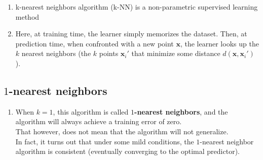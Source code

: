 \begin{enumerate}
    \item k-nearest neighbors algorithm (k-NN) is a non-parametric supervised learning method

    \item Here, at training time, the learner simply memorizes the dataset. Then, at prediction time, when confronted with a new point $\mathbf{x}$, the learner looks up the $k$ nearest neighbors (the $k$ points $\mathbf{x}_i'$ that minimize some distance $d(\mathbf{x}, \mathbf{x}_i')$).
    
\end{enumerate}

\subsection{$1$-nearest neighbors} \label{1-nearest neighbors}

\begin{enumerate}
    \item When $k=1$, this algorithm is called \textbf{$1$-nearest neighbors}, and the algorithm will always achieve a training error of zero.\\
    That however, does not mean that the algorithm will not generalize.\\
    In fact, it turns out that under some mild conditions, the $1$-nearest neighbor algorithm is consistent (eventually converging to the optimal predictor).

    
\end{enumerate}

























